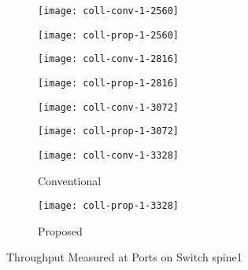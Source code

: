 \begin{figure}
    \centering

    \begin{subfigure}{.47\linewidth}
        \texttt{[image: coll-conv-1-2560]}
    \end{subfigure}
    \hfill
    \begin{subfigure}{.47\linewidth}
        \texttt{[image: coll-prop-1-2560]}
    \end{subfigure}

    \begin{subfigure}{.47\linewidth}
        \texttt{[image: coll-conv-1-2816]}
    \end{subfigure}
    \hfill
    \begin{subfigure}{.47\linewidth}
        \texttt{[image: coll-prop-1-2816]}
    \end{subfigure}

    \begin{subfigure}{.47\linewidth}
        \texttt{[image: coll-conv-1-3072]}
    \end{subfigure}
    \hfill
    \begin{subfigure}{.47\linewidth}
        \texttt{[image: coll-prop-1-3072]}
    \end{subfigure}

    \begin{subfigure}{.47\linewidth}
        \texttt{[image: coll-conv-1-3328]}
        \caption{Conventional}%
        \label{fig:unisonflow-bw-spine1-conv}
    \end{subfigure}
    \hfill
    \begin{subfigure}{.47\linewidth}
        \texttt{[image: coll-prop-1-3328]}
        \caption{Proposed}%
        \label{fig:unisonflow-bw-spine1-prop}
    \end{subfigure}

    \caption{Throughput Measured at Ports on Switch spine1}%
    \label{fig:unisonflow-bw-spine1}
\end{figure}


